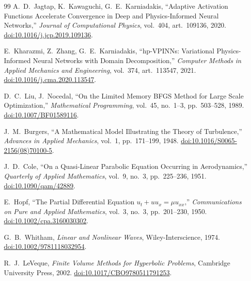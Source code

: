 \documentclass[11pt,a4paper]{report}
\begin{document}
\begin{thebibliography}{99}
A.~D.~Jagtap, K.~Kawaguchi, G.~E.~Karniadakis, ``Adaptive Activation Functions Accelerate Convergence in Deep and Physics-Informed Neural Networks,'' \textit{Journal of Computational Physics}, vol.~404, art.~109136, 2020.
\href{https://doi.org/10.1016/j.jcp.2019.109136}{doi:10.1016/j.jcp.2019.109136}.

E.~Kharazmi, Z.~Zhang, G.~E.~Karniadakis, ``hp-VPINNs: Variational Physics-Informed Neural Networks with Domain Decomposition,'' \textit{Computer Methods in Applied Mechanics and Engineering}, vol.~374, art.~113547, 2021.
\href{https://doi.org/10.1016/j.cma.2020.113547}{doi:10.1016/j.cma.2020.113547}.

D.~C.~Liu, J.~Nocedal, ``On the Limited Memory BFGS Method for Large Scale Optimization,'' \textit{Mathematical Programming}, vol.~45, no.~1--3, pp.~503--528, 1989.
\href{https://doi.org/10.1007/BF01589116}{doi:10.1007/BF01589116}.

J.~M.~Burgers, ``A Mathematical Model Illustrating the Theory of Turbulence,'' \textit{Advances in Applied Mechanics}, vol.~1, pp.~171--199, 1948.
\href{https://doi.org/10.1016/S0065-2156(08)70100-5}{doi:10.1016/S0065-2156(08)70100-5}.

J.~D.~Cole, ``On a Quasi-Linear Parabolic Equation Occurring in Aerodynamics,'' \textit{Quarterly of Applied Mathematics}, vol.~9, no.~3, pp.~225--236, 1951.
\href{https://doi.org/10.1090/qam/42889}{doi:10.1090/qam/42889}.

E.~Hopf, ``The Partial Differential Equation $u_{t} + u u_{x} = \mu u_{xx}$,'' \textit{Communications on Pure and Applied Mathematics}, vol.~3, no.~3, pp.~201--230, 1950.
\href{https://doi.org/10.1002/cpa.3160030302}{doi:10.1002/cpa.3160030302}.

G.~B.~Whitham, \textit{Linear and Nonlinear Waves}, Wiley-Interscience, 1974.
\href{https://doi.org/10.1002/9781118032954}{doi:10.1002/9781118032954}.

R.~J.~LeVeque, \textit{Finite Volume Methods for Hyperbolic Problems}, Cambridge University Press, 2002.
\href{https://doi.org/10.1017/CBO9780511791253}{doi:10.1017/CBO9780511791253}.

\end{thebibliography}
\end{document}
